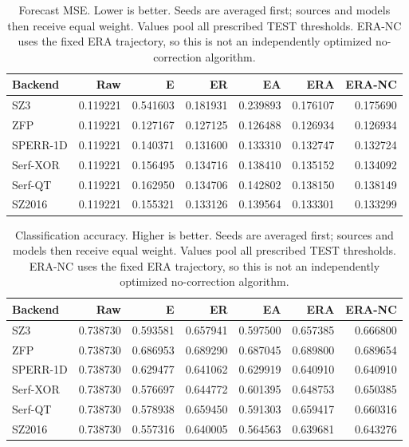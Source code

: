 \begin{table}[t]
\centering
\small
\setlength{\tabcolsep}{5pt}
\caption{Forecast MSE. Lower is better. Seeds are averaged first; sources and models then receive equal weight. Values pool all prescribed TEST thresholds. ERA-NC uses the fixed ERA trajectory, so this is not an independently optimized no-correction algorithm.}
\label{tab:s-ablation-quality-forecast-mse}
\begin{tabular}{@{}lrrrrrr@{}}
\toprule
Backend & Raw & E & ER & EA & ERA & ERA-NC \\
\midrule
SZ3 & 0.119221 & 0.541603 & 0.181931 & 0.239893 & 0.176107 & 0.175690 \\
ZFP & 0.119221 & 0.127167 & 0.127125 & 0.126488 & 0.126934 & 0.126934 \\
SPERR-1D & 0.119221 & 0.140371 & 0.131600 & 0.133310 & 0.132747 & 0.132724 \\
Serf-XOR & 0.119221 & 0.156495 & 0.134716 & 0.138410 & 0.135152 & 0.134092 \\
Serf-QT & 0.119221 & 0.162950 & 0.134706 & 0.142802 & 0.138150 & 0.138149 \\
SZ2016 & 0.119221 & 0.155321 & 0.133126 & 0.139564 & 0.133301 & 0.133299 \\
\bottomrule
\end{tabular}
\end{table}

\begin{table}[t]
\centering
\small
\setlength{\tabcolsep}{5pt}
\caption{Classification accuracy. Higher is better. Seeds are averaged first; sources and models then receive equal weight. Values pool all prescribed TEST thresholds. ERA-NC uses the fixed ERA trajectory, so this is not an independently optimized no-correction algorithm.}
\label{tab:s-ablation-quality-classification-accuracy}
\begin{tabular}{@{}lrrrrrr@{}}
\toprule
Backend & Raw & E & ER & EA & ERA & ERA-NC \\
\midrule
SZ3 & 0.738730 & 0.593581 & 0.657941 & 0.597500 & 0.657385 & 0.666800 \\
ZFP & 0.738730 & 0.686953 & 0.689290 & 0.687045 & 0.689800 & 0.689654 \\
SPERR-1D & 0.738730 & 0.629477 & 0.641062 & 0.629919 & 0.640910 & 0.640910 \\
Serf-XOR & 0.738730 & 0.576697 & 0.644772 & 0.601395 & 0.648753 & 0.650385 \\
Serf-QT & 0.738730 & 0.578938 & 0.659450 & 0.591303 & 0.659417 & 0.660316 \\
SZ2016 & 0.738730 & 0.557316 & 0.640005 & 0.564563 & 0.639681 & 0.643276 \\
\bottomrule
\end{tabular}
\end{table}

